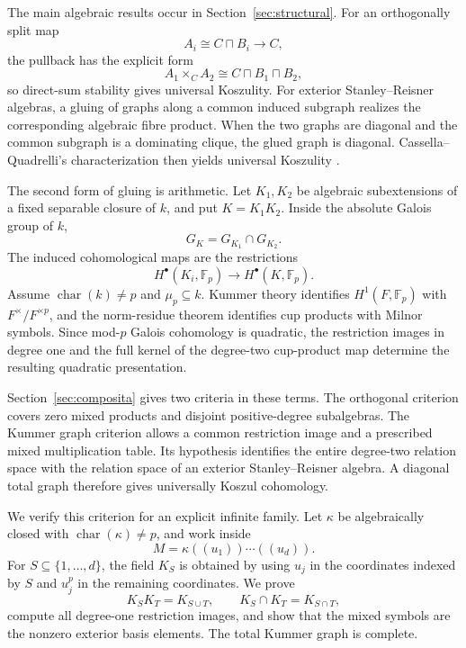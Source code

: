 \documentclass[12pt]{amsart}
\theoremstyle{plain}
\theoremstyle{definition}
\theoremstyle{remark}
\numberwithin{equation}{section}
\begin{document}
The main algebraic results occur in Section~\ref{sec:structural}. For an
orthogonally split map
\[
A_i\cong C\sqcap B_i\longrightarrow C,
\]
the pullback has the explicit form
\[
A_1\times_C A_2\cong C\sqcap B_1\sqcap B_2,
\]
so direct-sum stability gives universal Koszulity. For exterior
Stanley--Reisner algebras, a gluing of graphs along a common induced subgraph
realizes the corresponding algebraic fibre product. When the two graphs are
diagonal and the common subgraph is a dominating clique, the glued graph is
diagonal. Cassella--Quadrelli's characterization then yields universal
Koszulity \cite{CassellaQuadrelli}.

The second form of gluing is arithmetic. Let \(K_1,K_2\) be algebraic
subextensions of a fixed separable closure of \(k\), and put \(K=K_1K_2\).
Inside the absolute Galois group of \(k\),
\[
G_K=G_{K_1}\cap G_{K_2}.
\]
The induced cohomological maps are the restrictions
\[
H^\bullet(K_i,\mathbb F_p)\longrightarrow H^\bullet(K,\mathbb F_p).
\]
Assume \(\operatorname{char}(k)\neq p\) and \(\mu_p\subseteq k\).
Kummer theory identifies \(H^1(F,\mathbb F_p)\) with
\(F^\times/F^{\times p}\), and the norm-residue theorem identifies cup
products with Milnor symbols. Since mod-\(p\) Galois cohomology is quadratic,
the restriction images in degree one and the full kernel of the degree-two
cup-product map determine the resulting quadratic presentation.

Section~\ref{sec:composita} gives two criteria in these terms. The
orthogonal criterion covers zero mixed products and disjoint positive-degree
subalgebras. The Kummer graph criterion allows a common restriction image
and a prescribed mixed multiplication table. Its hypothesis identifies the
entire degree-two relation space with the relation space of an exterior
Stanley--Reisner algebra. A diagonal total graph therefore gives universally
Koszul cohomology.

We verify this criterion for an explicit infinite family. Let \(\kappa\)
be algebraically closed with \(\operatorname{char}(\kappa)\neq p\), and
work inside
\[
M=\kappa((u_1))\cdots((u_d)).
\]
For \(S\subseteq\{1,\dots,d\}\), the field \(K_S\) is obtained by using
\(u_j\) in the coordinates indexed by \(S\) and \(u_j^p\) in the remaining
coordinates. We prove
\[
K_SK_T=K_{S\cup T},\qquad K_S\cap K_T=K_{S\cap T},
\]
compute all degree-one restriction images, and show that the mixed symbols are
the nonzero exterior basis elements. The total Kummer graph is complete.
\end{document}

